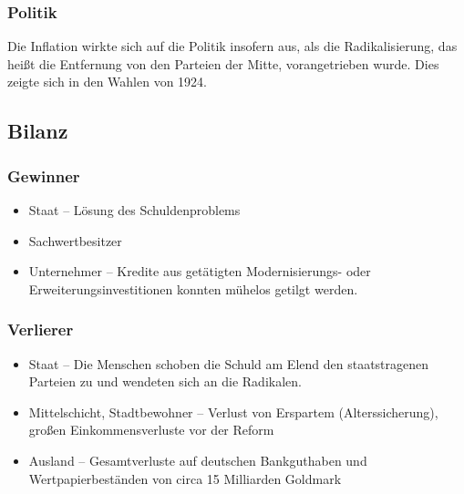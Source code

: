 \subsubsection{Politik}

Die Inflation wirkte sich auf die Politik insofern aus, als die
Radikalisierung, das heißt die Entfernung von den Parteien der Mitte,
vorangetrieben wurde. Dies zeigte sich in den Wahlen von 1924.


\subsection*{Bilanz}

\subsubsection{Gewinner}

\begin{itemize}
\item Staat -- Lösung des Schuldenproblems
\item Sachwertbesitzer
\item Unternehmer -- Kredite aus getätigten Modernisierungs- oder
Erweiterungsinvestitionen konnten mühelos getilgt werden. 
\end{itemize}

\subsubsection{Verlierer}

\begin{itemize}
\item Staat -- Die Menschen schoben die Schuld am Elend den
staatstragenen Parteien zu und wendeten sich an die Radikalen.
\item Mittelschicht, Stadtbewohner -- Verlust von Erspartem
(Alterssicherung), großen Einkommensverluste vor der Reform
\item Ausland -- Gesamtverluste auf deutschen Bankguthaben und
Wertpapierbeständen von circa 15 Milliarden Goldmark
\end{itemize}

\endinput
